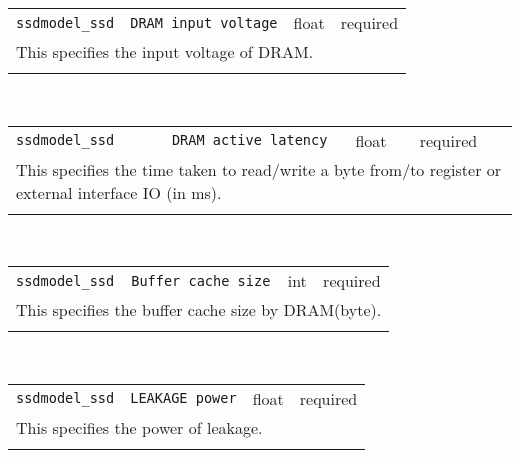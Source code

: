 \noindent 
\begin{tabular}{|p{\lpmodwidth}|p{\lpnamewidth}|p{0.5in}|p{0.5in}|}
\cline{1-4}
\texttt{ssdmodel\_ssd} & \texttt{DRAM input voltage} & float & required \\ 
\cline{1-4}
\multicolumn{4}{|p{6in}|}{
This specifies the input voltage of DRAM.
}\\ 
\cline{1-4}
\multicolumn{4}{p{5in}}{}\\
\end{tabular}\\ 
\noindent 
\begin{tabular}{|p{\lpmodwidth}|p{\lpnamewidth}|p{0.5in}|p{0.5in}|}
\cline{1-4}
\texttt{ssdmodel\_ssd} & \texttt{DRAM active latency} & float & required \\ 
\cline{1-4}
\multicolumn{4}{|p{6in}|}{
This specifies the time taken to read/write a byte from/to register
or external interface IO (in ms).
}\\ 
\cline{1-4}
\multicolumn{4}{p{5in}}{}\\
\end{tabular}\\ 
\noindent 
\begin{tabular}{|p{\lpmodwidth}|p{\lpnamewidth}|p{0.5in}|p{0.5in}|}
\cline{1-4}
\texttt{ssdmodel\_ssd} & \texttt{Buffer cache size} & int & required \\ 
\cline{1-4}
\multicolumn{4}{|p{6in}|}{
This specifies the buffer cache size by DRAM(byte).
}\\ 
\cline{1-4}
\multicolumn{4}{p{5in}}{}\\
\end{tabular}\\ 
\noindent 
\begin{tabular}{|p{\lpmodwidth}|p{\lpnamewidth}|p{0.5in}|p{0.5in}|}
\cline{1-4}
\texttt{ssdmodel\_ssd} & \texttt{LEAKAGE power} & float & required \\ 
\cline{1-4}
\multicolumn{4}{|p{6in}|}{
This specifies the power of leakage.
}\\ 
\cline{1-4}
\multicolumn{4}{p{5in}}{}\\
\end{tabular}\\ 
